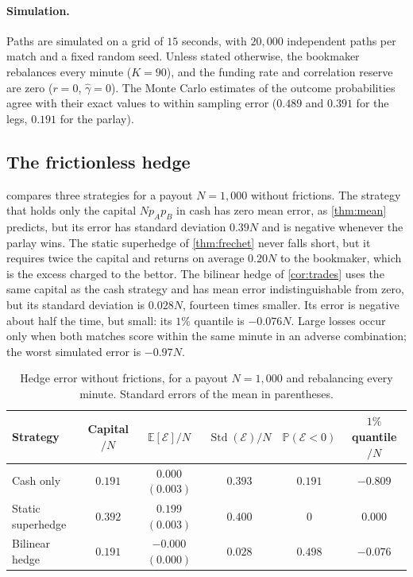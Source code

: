 \documentclass[11pt,a4paper]{article}
\theoremstyle{plain}
\theoremstyle{definition}
\theoremstyle{remark}
\newcommand{\E}{\mathbb{E}}
\newcommand{\Prob}{\mathbb{P}}
\newcommand{\1}{\mathbf{1}}
\begin{document}
\paragraph{Simulation.}
Paths are simulated on a grid of $15$ seconds, with $20{,}000$ independent paths per match and a fixed random seed. Unless stated otherwise, the bookmaker rebalances every minute ($K=90$), and the funding rate and correlation reserve are zero ($r=0$, $\hat\gamma=0$). The Monte Carlo estimates of the outcome probabilities agree with their exact values to within sampling error ($0.489$ and $0.391$ for the legs, $0.191$ for the parlay).

\subsection{The frictionless hedge}

 compares three strategies for a payout $N=1{,}000$ without frictions. The strategy that holds only the capital $Np_Ap_B$ in cash has zero mean error, as \cref{thm:mean} predicts, but its error has standard deviation $0.39N$ and is negative whenever the parlay wins. The static superhedge of \cref{thm:frechet} never falls short, but it requires twice the capital and returns on average $0.20N$ to the bookmaker, which is the excess charged to the bettor. The bilinear hedge of \cref{cor:trades} uses the same capital as the cash strategy and has mean error indistinguishable from zero, but its standard deviation is $0.028N$, fourteen times smaller. Its error is negative about half the time, but small: its $1\%$ quantile is $-0.076N$. Large losses occur only when both matches score within the same minute in an adverse combination; the worst simulated error is $-0.97N$.

\begin{table}[ht]
\centering
\small
\begin{tabular}{lccccc}
\toprule
Strategy & Capital$/N$ & $\E[\mathcal{E}]/N$ & $\operatorname{Std}(\mathcal{E})/N$ & $\Prob(\mathcal{E}<0)$ & $1\%$ quantile$/N$\\
\midrule
Cash only & $0.191$ & $0.000$ $(0.003)$ & $0.393$ & $0.191$ & $-0.809$\\
Static superhedge & $0.392$ & $0.199$ $(0.003)$ & $0.400$ & $0$ & $0.000$\\
Bilinear hedge & $0.191$ & $-0.000$ $(0.000)$ & $0.028$ & $0.498$ & $-0.076$\\
\bottomrule
\end{tabular}
\caption{Hedge error without frictions, for a payout $N=1{,}000$ and rebalancing every minute. Standard errors of the mean in parentheses.}
\label{tab:sim-frictionless}
\end{table}
\end{document}
